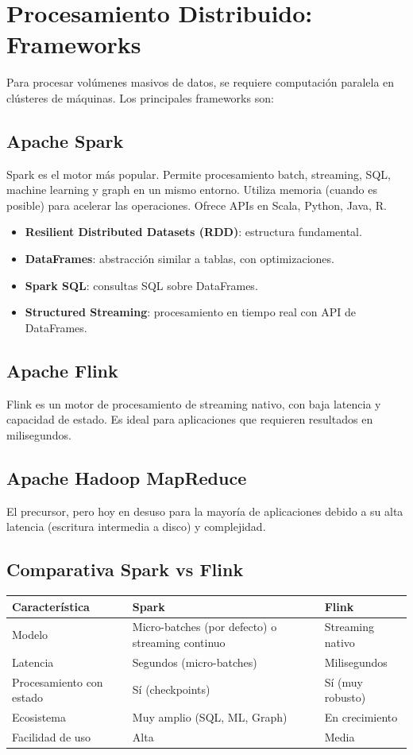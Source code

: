 \documentclass[12pt,a4paper,openany,oneside]{book}
\begin{document}
\chapter{Procesamiento Distribuido: Frameworks}
Para procesar volúmenes masivos de datos, se requiere computación paralela en clústeres de máquinas. Los principales frameworks son:

\section{Apache Spark}
Spark es el motor más popular. Permite procesamiento batch, streaming, SQL, machine learning y graph en un mismo entorno. Utiliza memoria (cuando es posible) para acelerar las operaciones. Ofrece APIs en Scala, Python, Java, R.

\begin{itemize}
    \item \textbf{Resilient Distributed Datasets (RDD)}: estructura fundamental.
    \item \textbf{DataFrames}: abstracción similar a tablas, con optimizaciones.
    \item \textbf{Spark SQL}: consultas SQL sobre DataFrames.
    \item \textbf{Structured Streaming}: procesamiento en tiempo real con API de DataFrames.
\end{itemize}

\section{Apache Flink}
Flink es un motor de procesamiento de streaming nativo, con baja latencia y capacidad de estado. Es ideal para aplicaciones que requieren resultados en milisegundos.

\section{Apache Hadoop MapReduce}
El precursor, pero hoy en desuso para la mayoría de aplicaciones debido a su alta latencia (escritura intermedia a disco) y complejidad.

\section{Comparativa Spark vs Flink}
\begin{center}
\begin{tabular}{|l|l|l|}
\hline
\textbf{Característica} & \textbf{Spark} & \textbf{Flink} \\ \hline
Modelo & Micro-batches (por defecto) o streaming continuo & Streaming nativo \\
Latencia & Segundos (micro-batches) & Milisegundos \\
Procesamiento con estado & Sí (checkpoints) & Sí (muy robusto) \\
Ecosistema & Muy amplio (SQL, ML, Graph) & En crecimiento \\
Facilidad de uso & Alta & Media \\ \hline
\end{tabular}
\end{center}
\end{document}
